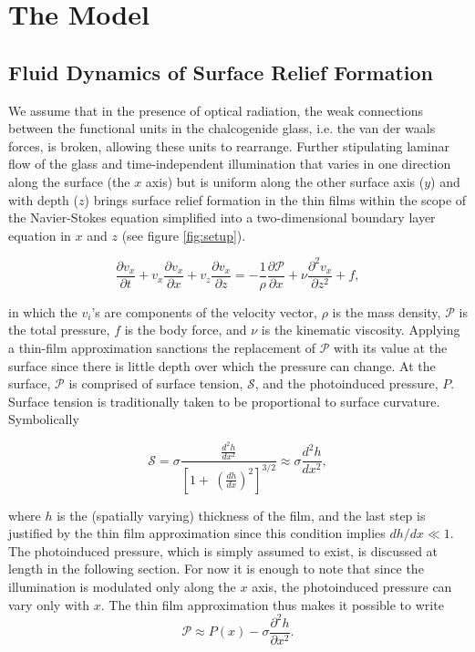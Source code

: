 \documentclass[aps, prl, twocolumn, groupedaddress]{revtex4-1}
\begin{document}
\section{The Model}
\subsection{Fluid Dynamics of Surface Relief Formation}
\label{sec:fluids}

We assume that in the presence of optical radiation, the weak
connections between the functional units in the chalcogenide glass,
i.e. the van der waals forces, is broken, allowing these units to
rearrange. Further stipulating laminar flow of the glass and
time-independent illumination that varies in one direction along the
surface (the $x$ axis) but is uniform along the other surface axis
($y$) and with depth ($z$) brings surface relief formation in the thin
films within the scope of the Navier-Stokes equation simplified into a
two-dimensional boundary layer equation in $x$ and $z$ \cite{levich}
(see figure \ref{fig:setup}).

\begin{equation}
\frac{\partial v_x}{\partial t}+v_x\frac{\partial v_x}{\partial x} +v_z\frac{\partial
v_x}{\partial z} = - \frac{1}{\rho}\frac{\partial \mathcal{P}}{\partial
x}+\nu\frac{\partial^2 v_x}{\partial z^2}+f \mathrm{,} \label{eq:levstokes}
\end{equation}

in which the $v_i$'s are components of the velocity vector, $\rho$ is
the mass density, $\mathcal{P}$ is the total pressure, $f$ is the body
force, and $\nu$ is the kinematic viscosity. Applying a thin-film
approximation sanctions the replacement of $\mathcal{P}$ with its
value at the surface since there is little depth over which the
pressure can change. At the surface, $\mathcal{P}$ is comprised of surface
tension, $\mathcal{S}$, and the photoinduced pressure, $P$. Surface
tension is traditionally taken to be proportional to surface
curvature. Symbolically

\begin{equation}
\mathcal{S}= \sigma \frac{\frac{d^2h}{dx^2}}{\left[1+\
\left(\frac{dh}{dx}\right)^2\right]^{3/2}}\approx \sigma \frac{d^2h}{dx^2} \mathrm{,}
\label{eq:surften}
\end{equation}


where $h$ is
the (spatially varying) thickness of the film, and the last step is
justified by the thin film approximation since this condition implies
$dh/dx\ll 1$. The photoinduced pressure, which is simply assumed to
exist, is discussed at length in the following section. For now
it is enough to note that since the illumination is modulated only
along the $x$ axis, the photoinduced pressure can vary only with
$x$. The thin film approximation thus makes it possible to write
\begin{equation}
\mathcal{P} \approx P(x)-\sigma\frac{\partial^2 h}{\partial x^2} \mathrm{.}
\end{equation}
\end{document}
